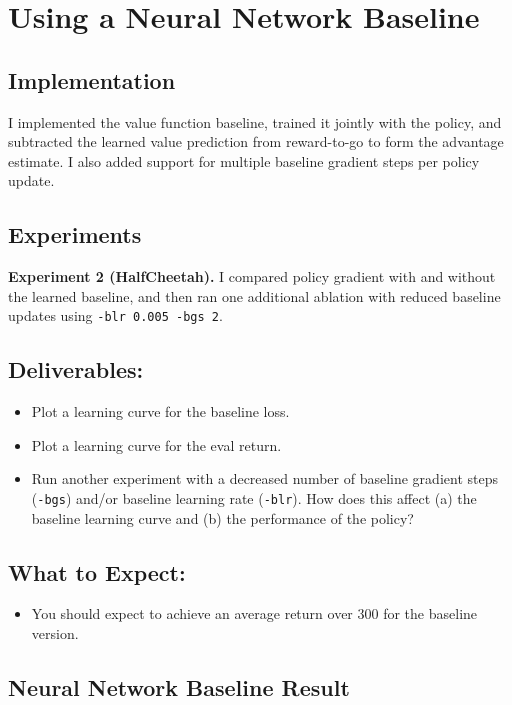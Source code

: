 \documentclass{article}
\begin{document}
\section{Using a Neural Network Baseline}
\label{sec:nn_baseline}

\subsection{Implementation}

I implemented the value function baseline, trained it jointly with the policy, and subtracted the learned value prediction from reward-to-go to form the advantage estimate. I also added support for multiple baseline gradient steps per policy update.

\subsection{Experiments}
\textbf{Experiment 2 (HalfCheetah).} I compared policy gradient with and without the learned baseline, and then ran one additional ablation with reduced baseline updates using \texttt{-blr 0.005 -bgs 2}.

\subsection*{Deliverables:}
\begin{itemize}
    \item Plot a learning curve for the baseline loss.
    \item Plot a learning curve for the eval return.
    \item Run another experiment with a decreased number of baseline gradient steps (\texttt{-bgs}) and/or baseline learning rate (\texttt{-blr}). How does this affect (a) the baseline learning curve and (b) the performance of the policy?
\end{itemize}

\subsection*{What to Expect:}
\begin{itemize}
  \item You should expect to achieve an average return over $300$ for the baseline version.
\end{itemize}

\subsection{Neural Network Baseline Result}
\end{document}
